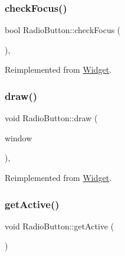 \mbox{\label{class_radio_button_a693581ddb77b4f4c5f8e133eb1369390}} 
\subsubsection{\texorpdfstring{checkFocus()}{checkFocus()}}
{\footnotesize\ttfamily bool Radio\+Button\+::check\+Focus (\begin{DoxyParamCaption}{ }\end{DoxyParamCaption})\hspace{0.3cm}{\ttfamily [override]}, {\ttfamily [virtual]}}



Reimplemented from \mbox{\hyperlink{class_widget_ac8121758d9fcfedb4ff119abeb7d0652}{Widget}}.

\mbox{\label{class_radio_button_aa8efb2e8d54a0293fd1058a7e49ca526}} 
\subsubsection{\texorpdfstring{draw()}{draw()}}
{\footnotesize\ttfamily void Radio\+Button\+::draw (\begin{DoxyParamCaption}\item[{sf\+::\+Render\+Window \&}]{window }\end{DoxyParamCaption})\hspace{0.3cm}{\ttfamily [override]}, {\ttfamily [virtual]}}



Reimplemented from \mbox{\hyperlink{class_widget_ae33a60123dee736ad8ece7277711f3d4}{Widget}}.

\mbox{\label{class_radio_button_a168305da89d8c859e170fbc50abbe5b3}} 
\subsubsection{\texorpdfstring{getActive()}{getActive()}}
{\footnotesize\ttfamily void Radio\+Button\+::get\+Active (\begin{DoxyParamCaption}{ }\end{DoxyParamCaption})\hspace{0.3cm}{\ttfamily [virtual]}}



